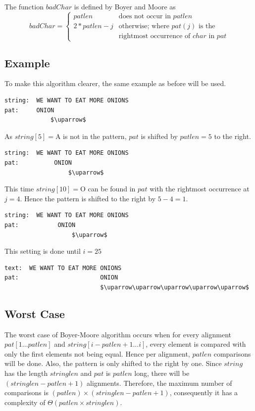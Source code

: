 The function $badChar$ is defined by Boyer and Moore as\\

\begin{equation*}
  badChar =
  \begin{cases}
    patlen & \text{does not occur in $patlen$} \\
    2*patlen-j & \text{otherwise; where $pat(j)$ is the} \\
     & \text{rightmost occurrence of $char$ in $pat$}
  \end{cases}
\end{equation*}

\subsection{Example}
To make this algorithm clearer, the same example as before will be used.
\begin{lstlisting}
string:  WE WANT TO EAT MORE ONIONS
pat:     ONION
             $\uparrow$
\end{lstlisting}

As $string[5]=$A is not in the pattern, $pat$ is shifted by $patlen=5$ to the right.

\begin{lstlisting}
string:  WE WANT TO EAT MORE ONIONS
pat:          ONION
                  $\uparrow$
\end{lstlisting}

This time $string[10]=$O can be found in $pat$ with the rightmost occurrence at $j=4$. Hence the pattern is shifted to the right by $5-4=1$.

\begin{lstlisting}
string:  WE WANT TO EAT MORE ONIONS
pat:           ONION
                   $\uparrow$
\end{lstlisting}

This setting is done until $i=25$

\begin{lstlisting}
text:  WE WANT TO EAT MORE ONIONS
pat:                       ONION
                           $\uparrow\uparrow\uparrow\uparrow\uparrow$
\end{lstlisting}

\subsection{Worst Case}
The worst case of Boyer-Moore algorithm occurs when for every alignment $pat[1...patlen]$ and $string[i-patlen+1...i]$, every element is compared with only the first elements not being equal. Hence per alignment, $patlen$ comparisons will be done. Also, the pattern is only shifted to the right by one. Since $string$ has the length $stringlen$ and $pat$ is $patlen$ long, there will be $(stringlen-patlen+1)$ alignments. Therefore, the maximum number of comparisons is $(patlen)\times(stringlen-patlen+1)$, consequently it has a complexity of $\Theta(patlen \times stringlen)$.


